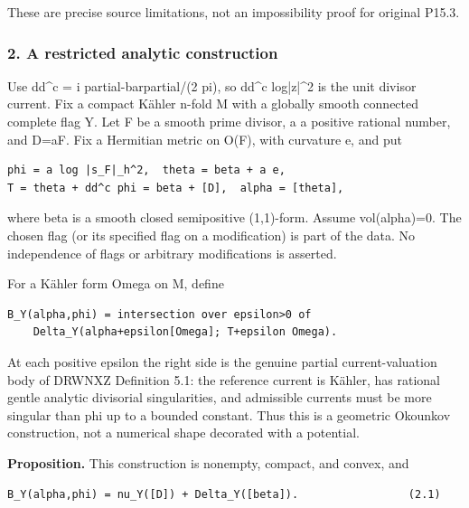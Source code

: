 \documentclass[11pt]{article}
\begin{document}
These are precise source limitations, not an impossibility proof for original P15.3.

\subsubsection{2. A restricted analytic construction}

Use dd\textasciicircum{}\allowbreak{}c =\allowbreak{} i partial-\allowbreak{}barpartial/\allowbreak{}(2 pi), so dd\textasciicircum{}\allowbreak{}c log|z|\textasciicircum{}\allowbreak{}2 is the unit divisor current. Fix a compact Kähler n-\allowbreak{}fold M with a globally smooth connected complete flag Y. Let F be a smooth prime divisor, a a positive rational number, and D=\allowbreak{}aF. Fix a Hermitian metric on O(F), with curvature e, and put

\begin{Verbatim}[breaklines=true,fontsize=\small]
phi = a log |s_F|_h^2,  theta = beta + a e,
T = theta + dd^c phi = beta + [D],  alpha = [theta],
\end{Verbatim}

where beta is a smooth closed semipositive (1,1)-\allowbreak{}form. Assume vol(alpha)=\allowbreak{}0. The chosen flag (or its specified flag on a modification) is part of the data. No independence of flags or arbitrary modifications is asserted.

For a Kähler form Omega on M, define

\begin{Verbatim}[breaklines=true,fontsize=\small]
B_Y(alpha,phi) = intersection over epsilon>0 of
    Delta_Y(alpha+epsilon[Omega]; T+epsilon Omega).
\end{Verbatim}

At each positive epsilon the right side is the genuine partial current-\allowbreak{}valuation body of DRWNXZ Definition 5.1: the reference current is Kähler, has rational gentle analytic divisorial singularities, and admissible currents must be more singular than phi up to a bounded constant. Thus this is a geometric Okounkov construction, not a numerical shape decorated with a potential.

\textbf{Proposition.} This construction is nonempty, compact, and convex, and

\begin{Verbatim}[breaklines=true,fontsize=\small]
B_Y(alpha,phi) = nu_Y([D]) + Delta_Y([beta]).                 (2.1)
\end{Verbatim}
\end{document}
